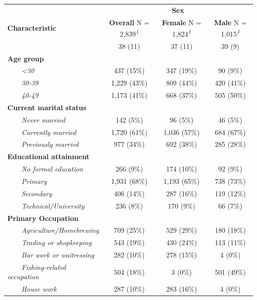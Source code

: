 \documentclass[
  letterpaper,
  DIV=11,
  numbers=noendperiod]{scrartcl}
\begin{document}
\begin{table}
\fontsize{12.0pt}{14.4pt}\selectfont
\begin{tabular*}{\linewidth}{@{\extracolsep{\fill}}lccc}
\toprule
 & \multicolumn{3}{c}{\textbf{Sex}} \\ 
\cmidrule(lr){2-4}
\textbf{Characteristic} & \textbf{Overall}  N = 2,839\textsuperscript{\textit{1}} & \textbf{Female}  N = 1,824\textsuperscript{\textit{1}} & \textbf{Male}  N = 1,015\textsuperscript{\textit{1}} \\ 
\midrule\addlinespace[2.5pt]
{\bfseries Age (years)} & 38 (11) & 37 (11) & 39 (9) \\ 
{\bfseries Age group} &  &  &  \\ 
{\itshape     <30} & 437 (15\%) & 347 (19\%) & 90 (9\%) \\ 
{\itshape     30-39} & 1,229 (43\%) & 809 (44\%) & 420 (41\%) \\ 
{\itshape     40-49} & 1,173 (41\%) & 668 (37\%) & 505 (50\%) \\ 
{\bfseries Current marital status} &  &  &  \\ 
{\itshape     Never married} & 142 (5\%) & 96 (5\%) & 46 (5\%) \\ 
{\itshape     Currently married} & 1,720 (61\%) & 1,036 (57\%) & 684 (67\%) \\ 
{\itshape     Previously married} & 977 (34\%) & 692 (38\%) & 285 (28\%) \\ 
{\bfseries Educational attainment} &  &  &  \\ 
{\itshape     No formal education} & 266 (9\%) & 174 (10\%) & 92 (9\%) \\ 
{\itshape     Primary} & 1,931 (68\%) & 1,193 (65\%) & 738 (73\%) \\ 
{\itshape     Secondary} & 406 (14\%) & 287 (16\%) & 119 (12\%) \\ 
{\itshape     Technical/University} & 236 (8\%) & 170 (9\%) & 66 (7\%) \\ 
{\bfseries Primary Occupation} &  &  &  \\ 
{\itshape     Agriculture/Homebrewing} & 709 (25\%) & 529 (29\%) & 180 (18\%) \\ 
{\itshape     Trading or shopkeeping} & 543 (19\%) & 430 (24\%) & 113 (11\%) \\ 
{\itshape     Bar work or waitressing} & 282 (10\%) & 278 (15\%) & 4 (0\%) \\ 
{\itshape     Fishing-related occupation} & 504 (18\%) & 3 (0\%) & 501 (49\%) \\ 
{\itshape     House work} & 287 (10\%) & 283 (16\%) & 4 (0\%) \\ 

\end{tabular*}
\end{table}
\end{document}
